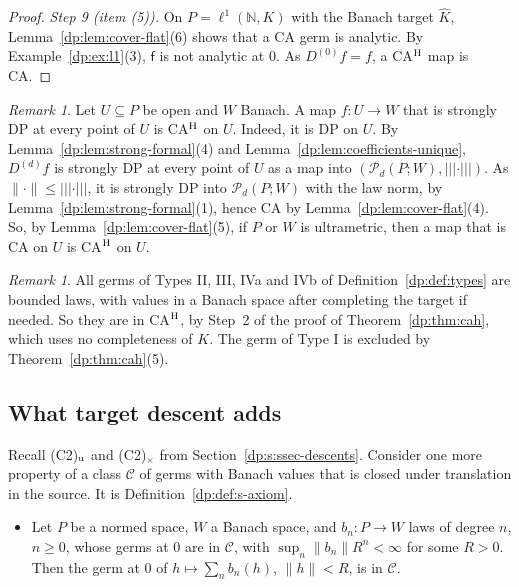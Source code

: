 \documentclass[11pt]{amsart}
\theoremstyle{definition}
\theoremstyle{remark}
\newtheorem{remark}[theorem]{Remark}
\numberwithin{equation}{section}
\newcommand{\N}{\mathbb N}
\newcommand{\norm}[1]{\lVert #1\rVert}
\newcommand{\cC}{\mathcal{C}}
\newcommand{\Kh}{\widehat K}
\theoremstyle{plain}
\theoremstyle{definition}
\theoremstyle{plain}
\newcommand{\cP}{\mathcal P}
\begin{document}
\begin{proof}
\emph{Step 9 (item (5)).} On $P=\ell^1(\N,K)$ with the Banach target $\Kh$, Lemma~\ref{dp:lem:cover-flat}(6) shows that a CA germ is analytic. By Example~\ref{dp:ex:l1}(3), $\mathsf f$ is not analytic at $0$. As $D^{(0)}f=f$, a CA$^{\rm H}$ map is CA.
\end{proof}

\begin{remark}\label{dp:rem:cah-um}
Let $U\subseteq P$ be open and $W$ Banach. A map $f\colon U\to W$ that is strongly DP at every point of $U$ is CA$^{\rm H}$ on $U$. Indeed, it is DP on $U$. By Lemma~\ref{dp:lem:strong-formal}(4) and Lemma~\ref{dp:lem:coefficients-unique}, $D^{(d)}f$ is strongly DP at every point of $U$ as a map into $(\cP_d(P;W),\lvert\!\lvert\!\lvert\cdot\rvert\!\rvert\!\rvert)$. As $\norm\cdot\le\lvert\!\lvert\!\lvert\cdot\rvert\!\rvert\!\rvert$, it is strongly DP into $\cP_d(P;W)$ with the law norm, by Lemma~\ref{dp:lem:strong-formal}(1), hence CA by Lemma~\ref{dp:lem:cover-flat}(4). So, by Lemma~\ref{dp:lem:cover-flat}(5), if $P$ or $W$ is ultrametric, then a map that is CA on $U$ is CA$^{\rm H}$ on $U$.
\end{remark}

\begin{remark}\label{dp:rem:cah-types}
All germs of Types II, III, IVa and IVb of Definition~\ref{dp:def:types} are bounded laws, with values in a Banach space after completing the target if needed. So they are in CA$^{\rm H}$, by Step~2 of the proof of Theorem~\ref{dp:thm:cah}, which uses no completeness of $K$. The germ of Type I is excluded by Theorem~\ref{dp:thm:cah}(5).
\end{remark}

\subsection{What target descent adds}\label{dp:ssec:ca-descents}

Recall (C2)$_{\rm u}$ and (C2)$_\times$ from Section~\ref{dp:s:ssec-descents}. Consider one more property of a class $\cC$ of germs with Banach values that is closed under translation in the source. It is Definition~\ref{dp:def:s-axiom}.
\begin{itemize}
\item[(S)] Let $P$ be a normed space, $W$ a Banach space, and $b_n\colon P\to W$ laws of degree $n$, $n\ge0$, whose germs at $0$ are in $\cC$, with $\sup_n\norm{b_n}R^n<\infty$ for some $R>0$. Then the germ at $0$ of $h\mapsto\sum_nb_n(h)$, $\norm h<R$, is in $\cC$.
\end{itemize}
\end{document}

